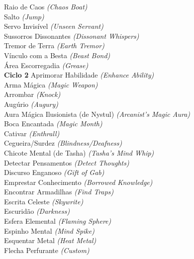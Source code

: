 \documentclass{RPG_Adventure}[2021/10/20]
\begin{document}
{\normalsize Raio de Caos \textit{(Chaos Boat)}\\ }
{\normalsize Salto \textit{(Jump)}\\ }
{\normalsize Servo Invisível \textit{(Unseen Servant)}\\ }
{\normalsize Sussorros Dissonantes \textit{(Dissonant Whispers)}\\ }
{\normalsize Tremor de Terra \textit{(Earth Tremor)}\\ }
{\normalsize Vínculo com a Besta \textit{(Beast Bond)}\\ }
{\normalsize Área Escorregadia \textit{(Grease)}\\ }
\jump\noindent\textbf{Ciclo 2}
{\normalsize Aprimorar Habilidade \textit{(Enhance Ability)}\\ }
{\normalsize Arma Mágica \textit{(Magic Weapon)}\\ }
{\normalsize Arrombar \textit{(Knock)}\\ }
{\normalsize Augúrio \textit{(Augury)}\\ }
{\normalsize Aura Mágica Ilusionista (de Nystul) \textit{(Arcanist's Magic Aura)}\\ }
{\normalsize Boca Encantada \textit{(Magic Month)}\\ }
{\normalsize Cativar \textit{(Enthrall)}\\ }
{\normalsize Cegueira/Surdez \textit{(Blindness/Deafness)}\\ }
{\normalsize Chicote Mental (de Tasha) \textit{(Tasha's Mind Whip)}\\ }
{\normalsize Detectar Pensamentos \textit{(Detect Thoughts)}\\ }
{\normalsize Discurso Enganoso \textit{(Gift of Gab)}\\ }
{\normalsize Emprestar Conhecimento \textit{(Borrowed Knowledge)}\\ }
{\normalsize Encontrar Armadilhas \textit{(Find Traps)}\\ }
{\normalsize Escrita Celeste \textit{(Skywrite)}\\ }
{\normalsize Escuridão \textit{(Darkness)}\\ }
{\normalsize Esfera Elemental \textit{(Flaming Sphere)}\\ }
{\normalsize Espinho Mental \textit{(Mind Spike)}\\ }
{\normalsize Esquentar Metal \textit{(Heat Metal)}\\ }
{\normalsize Flecha Perfurante \textit{(Custom)}\\ }
\end{document}
